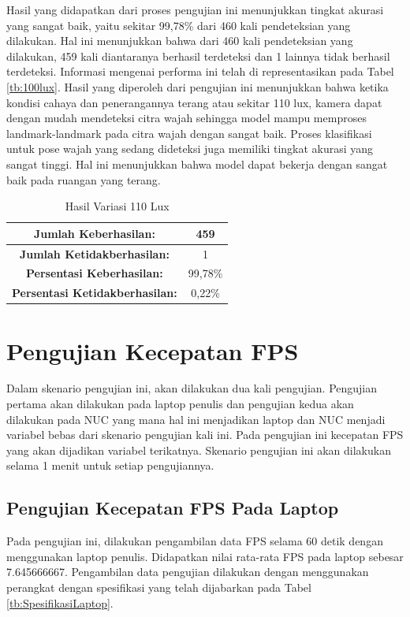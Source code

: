 Hasil yang didapatkan dari proses pengujian ini menunjukkan tingkat akurasi yang sangat baik, yaitu sekitar 99,78\% dari 460 kali pendeteksian yang dilakukan. Hal ini menunjukkan bahwa dari 460 kali pendeteksian yang dilakukan, 459 kali diantaranya berhasil terdeteksi dan 1 lainnya tidak berhasil terdeteksi. Informasi mengenai performa ini telah di representasikan pada Tabel \ref{tb:100lux}. Hasil yang diperoleh dari pengujian ini menunjukkan bahwa ketika kondisi cahaya dan penerangannya terang atau sekitar 110 lux, kamera dapat dengan mudah mendeteksi citra wajah sehingga model mampu memproses landmark-landmark pada citra wajah dengan sangat baik. Proses klasifikasi untuk pose wajah yang sedang dideteksi juga memiliki tingkat akurasi yang sangat tinggi. Hal ini menunjukkan bahwa model dapat bekerja dengan sangat baik pada ruangan yang terang.

\begin{longtable}{|c|c|}
  \caption{Hasil Variasi 110 Lux}
  \label{tb:110lux}   \\
  \hline
  \cellcolor[HTML]{C0C0C0}
  \textbf{Jumlah Keberhasilan:} & 459\\
  \hline
  \cellcolor[HTML]{C0C0C0}
  \textbf{Jumlah Ketidakberhasilan:} & 1\\
  \hline
  \cellcolor[HTML]{C0C0C0}
  \textbf{Persentasi Keberhasilan:} & 99,78\% \\
  \hline
  \cellcolor[HTML]{C0C0C0}
  \textbf{Persentasi Ketidakberhasilan:} & 0,22\% \\
  \hline
  \end{longtable}

\section{Pengujian Kecepatan FPS}
Dalam skenario pengujian ini, akan dilakukan dua kali pengujian. Pengujian pertama akan dilakukan pada laptop penulis dan pengujian kedua akan dilakukan pada NUC yang mana hal ini menjadikan laptop dan NUC menjadi variabel bebas dari skenario pengujian kali ini. Pada pengujian ini kecepatan FPS yang akan dijadikan variabel terikatnya. Skenario pengujian ini akan dilakukan selama 1 menit untuk setiap pengujiannya.


\subsection{Pengujian Kecepatan FPS Pada Laptop}
Pada pengujian ini, dilakukan pengambilan data FPS selama 60 detik dengan menggunakan laptop penulis. Didapatkan nilai rata-rata FPS pada laptop sebesar 7.645666667. Pengambilan data pengujian dilakukan dengan menggunakan perangkat dengan spesifikasi yang telah dijabarkan pada Tabel \ref{tb:SpesifikasiLaptop}.

